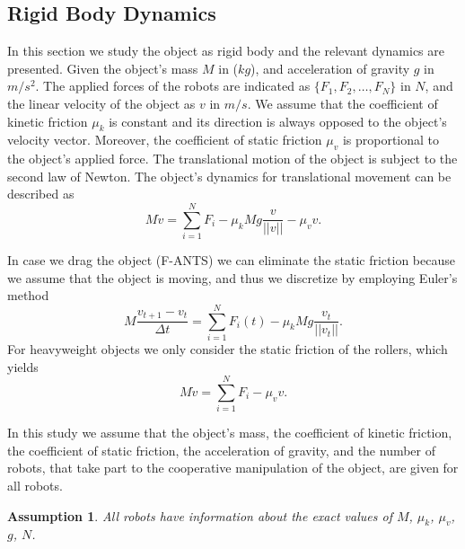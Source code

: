 \documentclass[letterpaper, 10 pt, conference]{ieeeconf}
\newtheorem{assumption}{\textbf{Assumption}}
\begin{document}
\subsection{Rigid Body Dynamics}\label{rbd}
In this section we study the object as rigid body and the relevant dynamics are presented. Given the object's mass $M$ in ($kg$), and acceleration of gravity $g$ in $m/s^2$. The applied forces of the robots are indicated as $\{ F_1, F_2, \hdots, F_N \}$ in $N$, and the linear velocity of the object as $v$ in $m/s$. We assume that the coefficient of kinetic friction $\mu_k$ is constant and its direction is always opposed to the object's velocity vector. Moreover, the coefficient of static friction $\mu_v$ is proportional to the object's applied force. The translational motion of the object is subject to the second law of Newton. The object's dynamics for translational movement can be described as 
\begin{equation}
M\dot{v}=\sum_{i=1}^N F_i-\mu_{k}Mg\frac{v}{||v||}-\mu_v v.
\end{equation}

In case we drag the object (F-ANTS) we can eliminate the static friction because we assume that the object is moving, and thus we discretize by employing Euler's method 
\begin{equation}\label{dod}
M\frac{v_{t+1}-v_t}{\Delta t}=\sum_{i=1}^N F_i(t)-\mu_kMg\frac{v_t}{||v_t||}.
\end{equation}
For heavyweight objects we only consider the static friction of the rollers, which yields 
\begin{equation}
M\dot{v}=\sum_{i=1}^N F_i-\mu_v v.
\end{equation}

In this study we assume that the object's mass, the coefficient of kinetic friction, the coefficient of static friction, the acceleration of gravity, and the number of robots, that take part to the cooperative manipulation of the object, are given for all robots.
\begin{assumption}\label{as1}
\textit{All robots have information about the exact values of $M$, $\mu_k$, $\mu_v$, $g$, $N$.}
\end{assumption}
 
\end{document}
